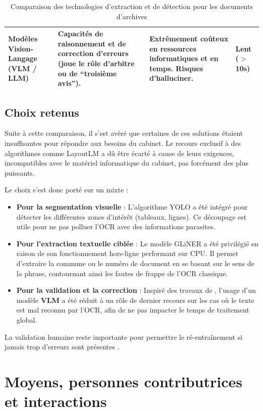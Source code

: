 \documentclass[a4paper,11pt]{article}
\begin{document}
\begin{table}[H]
{\begin{tabular}{|>{\raggedright\arraybackslash}p{4cm}|>{\raggedright\arraybackslash}p{4.5cm}|>{\raggedright\arraybackslash}p{4.5cm}|>{\centering\arraybackslash}p{2.5cm}|}
\hline
\textbf{Modèles Vision-Langage (VLM / LLM)} \newline \citep{xu_layoutlm-critic_2022} & Capacités de raisonnement et de correction d'erreurs (joue le rôle d'arbitre ou de \enquote{troisième avis}). & Extrêmement coûteux en ressources informatiques et en temps. Risques d'halluciner. & Lent ($>$ 10s) \\ 
\hline
\end{tabular}%
}
\caption{Comparaison des technologies d'extraction et de détection pour les documents d'archives}
\label{tab:comparatif_modeles}
\end{table}

\subsection{Choix retenus}
Suite à cette comparaison, il s'est avéré que certaines de ces solutions étaient insuffisantes pour répondre aux besoins du cabinet. Le recours exclusif à des algorithmes comme LayoutLM a dû être écarté à cause de leurs exigences, incompatibles avec le matériel informatique du cabinet, pas forcément des plus puissants. 

Le choix s'est donc porté sur un mixte : 
\begin{itemize}[leftmargin=1.2em]
  \item \textbf{Pour la segmentation visuelle} : L'algorithme YOLO a été intégré pour détecter les différentes zones d'intérêt (tableaux, lignes). Ce découpage est utile pour ne pas polluer l'OCR avec des informations parasites.
  \item \textbf{Pour l'extraction textuelle ciblée} : Le modèle GLiNER a été privilégié en raison de son fonctionnement hors-ligne performant sur CPU. Il permet d'extraire la commune ou le numéro de document en se basant sur le sens de la phrase, contournant ainsi les fautes de frappe de l'OCR classique.
  \item \textbf{Pour la validation et la correction} : Inspiré des travaux de \citet{xu_layoutlm-critic_2022}, l'usage d'un modèle \textbf{VLM} a été réduit à un rôle de dernier recours sur les cas où le texte est mal reconnu par l'OCR, afin de ne pas impacter le temps de traitement global.
\end{itemize}

La validation humaine reste importante pour permettre le ré-entraînement si jamais trop d'erreurs sont présentes \citep{beatrice_challenges_2023, sang_ree-hdsc_2024}.

\section{Moyens, personnes contributrices et interactions}
\end{document}
